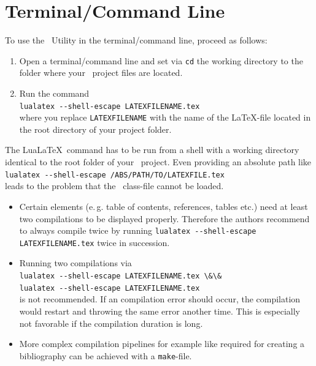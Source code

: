 	\section{Terminal/Command Line}
		\label{sec:docart-usage:command-line}
		To use the \productName~Utility in the terminal/command line, proceed as follows:
		\begin{enumerate}[label={\color{docartTurquoise}Step \arabic*:},leftmargin=*]
			\item Open a terminal/command line and set via \lstinline{cd} the working directory to the folder where your \productName~project files are located.
			\item Run the command\\[0.25cm]
			\lstinline{lualatex --shell-escape LATEXFILENAME.tex}\\[0.25cm]
			where you replace \lstinline{LATEXFILENAME} with the name of the \LaTeX-file located in the root directory of your project folder.
		\end{enumerate}
	
		\begin{daWarningBox}
			The Lua\LaTeX~command has to be run from a shell with a working directory identical to the root folder of your \productName~project.
			Even providing an absolute path like\\[0.125cm]
			\lstinline$lualatex --shell-escape /ABS/PATH/TO/LATEXFILE.tex$\\[0.125cm]
			leads to the problem that the \productName~class-file cannot be loaded.
		\end{daWarningBox}
	
		\begin{daInfoBox}
			\begin{itemize}[leftmargin=*]
				\setlength\itemsep{-0.1em}
				\item Certain elements (\mbox{e.\,g.} table of contents, references, tables etc.) need at least two compilations to be displayed properly. 
				Therefore the authors recommend to always compile twice by running \lstinline{lualatex --shell-escape LATEXFILENAME.tex} twice in succession.
				\item Running two compilations via\\[0.125cm]
				\lstinline$lualatex --shell-escape LATEXFILENAME.tex \&\&$\\  
				\lstinline$lualatex --shell-escape LATEXFILENAME.tex$\\[0.125cm]
				is not recommended. If an compilation error should occur, the compilation would restart and throwing the same error another time. This is especially not favorable if the compilation duration is long.
				\item More complex compilation pipelines for example like required for creating a bibliography can be achieved with a \mbox{\lstinline{make}-file}.
			\end{itemize}
		\end{daInfoBox}
		
